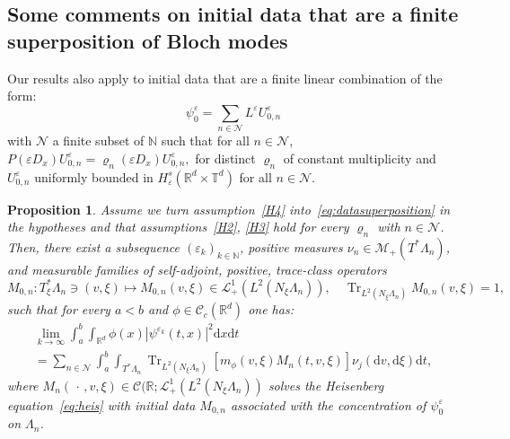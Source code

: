 \documentclass[10pt]{amsart}
\newtheorem{prop}[cdrthm]{Proposition}
\theoremstyle{definition}
\DeclareMathOperator{\Trr}{Tr}
\newcommand*\R{{\mathbb R}}
\newcommand*\N{{\mathbb N}}
\newcommand*\T{{\mathbb T}}
\newcommand*\eps{\varepsilon}
\newcommand*\Tr{\Trr}
\numberwithin{equation}{section}
\newcommand*{\dd}{\mathrm{d}}
\newcommand*{\dt}{\dd t}
\newcommand*{\dx}{\dd x}
\newcommand*{\dv}{\dd v}
\newcommand*{\dxi}{\dd \xi}
\begin{document}
\subsection{Some comments on initial data that are a finite superposition of Bloch modes}\label{sec:superposition}
Our results also apply to initial data that are a finite linear combination of the form:
\begin{equation}\label{eq:datasuperposition}
\psi^\eps_0=\sum_{n\in{\mathcal N}} L^\eps U^\eps_{0,n}
\end{equation}
with ${\mathcal N}$ a finite subset of $\N$ such that for all $n\in{\mathcal N}$, $P(\eps D_x) U^\eps_{0,n}= \varrho_n(\eps D_x) U^\eps_{0,n},$ for distinct $\varrho_n$ of constant multiplicity and $U^\eps_{0,n}$ uniformly bounded in $H^s_{\eps}(\R^d\times \T^d)$ for all $n\in{\mathcal N}$.

\begin{prop}\label{theo:superposition}
Assume we turn assumption~\eqref{H4} into~\eqref{eq:datasuperposition} in the hypotheses and that assumptions~\eqref{H2}, \eqref{H3} hold for every $\varrho_n$ with $n\in{\mathcal N}$. Then, there exist a subsequence $(\eps_k)_{k\in\N}$, positive measures $\nu_n\in\mathcal{M}_+(T^*\Lambda_n)$, and measurable families of self-adjoint, positive, trace-class operators
\[
M_{0,n}:T^*_\xi\Lambda_n\ni (v,\xi)\longmapsto M_{0,n}(v,\xi)\in \mathcal{L}_+^1(L^2(N_\xi\Lambda_n)),\quad \Tr_{L^2(N_\xi\Lambda_n)} M_{0,n}(v,\xi)=1,
\]
such that for every $a<b$ and $\phi\in \mathcal{C}_c(\R^d)$ one has:
\begin{multline*}
\lim_{k\to\infty}\int_a^b\int_{\R^d}\phi(x)|\psi^{\eps_k}(t,x)|^2\dx\dt\\
=\sum_{n\in{\mathcal N}}\int_a^b \int_{T^*\Lambda_n}\Tr_{L^2(N_\xi\Lambda_n)}\left[m_\phi(v,\xi)M_n(t,v,\xi)\right]\nu_j(\dv,\dxi)\dt,
\end{multline*}
where $M_n(\,\cdot\,, v,\xi)\in \mathcal{C}(\R;\mathcal{L}_+^1(L^2(N_\xi\Lambda_n))$ solves the Heisenberg equation~\eqref{eq:heis} with initial data $M_{0,n}$ associated with the concentration of $\psi^\eps_0$ on $\Lambda_n$.
\end{prop}
\end{document}
